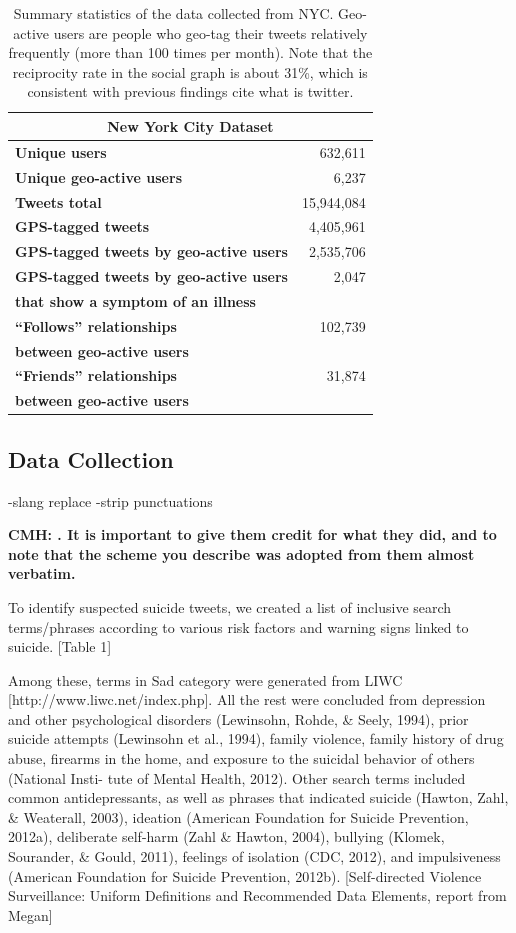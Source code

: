 \documentclass[11pt]{article}
\begin{document}
\begin{table}[t]
\small
\centering
\begin{tabular}{ l | r }
\multicolumn{2}{c}{\textbf{New York City Dataset}} \\
\hline
\textbf{Unique users}&       632,611      \\
\hline
\textbf{Unique geo-active users}&        6,237       \\
\hline
\textbf{Tweets total}&        15,944,084\\
\hline
\textbf{GPS-tagged tweets}&   4,405,961\\
\hline
\textbf{GPS-tagged tweets by geo-active users}&  2,535,706\\
\hline
\textbf{GPS-tagged tweets by geo-active users}&  2,047 \\
\textbf{that show a symptom of an illness}&\\
\hline
\textbf{``Follows'' relationships}&  102,739  \\
\textbf{between geo-active users}&\\
\hline
\textbf{``Friends'' relationships}&   31,874   \\
\textbf{between geo-active users}&\\
\end{tabular}
\caption{\small Summary statistics of the data collected from NYC. Geo-active users are people who geo-tag their tweets relatively frequently (more than 100 times per month). Note that the reciprocity rate in the social graph is about 31\%, which is consistent with previous findings  cite what is twitter.} 
\label{table::dataset}
\end{table}
\subsection{Data Collection}
-slang replace
-strip punctuations

\textbf{CMH: \cite{Jay}. It is important to give them credit for what they did, and to note that the scheme you describe was adopted from them almost verbatim.}

To identify suspected suicide tweets, we created a list of inclusive search terms/phrases according to various risk factors and warning signs linked to suicide. [Table 1]



Among these, terms in Sad category were generated from LIWC [http://www.liwc.net/index.php]. All the rest were concluded from depression and other psychological disorders (Lewinsohn, Rohde, \& Seely, 1994), prior suicide attempts (Lewinsohn et al., 1994), family violence, family history of drug abuse, firearms in the home, and exposure to the suicidal behavior of others (National Insti- tute of Mental Health, 2012). Other search terms included common antidepressants, as well as phrases that indicated suicide (Hawton, Zahl, \& Weaterall, 2003), ideation (American Foundation for Suicide Prevention, 2012a), deliberate self-harm (Zahl \& Hawton, 2004), bullying (Klomek, Sourander, \& Gould, 2011), feelings of isolation (CDC, 2012), and impulsiveness (American Foundation for Suicide Prevention, 2012b). [Self-directed Violence Surveillance: Uniform Definitions and Recommended Data Elements, report from Megan]
\end{document}
